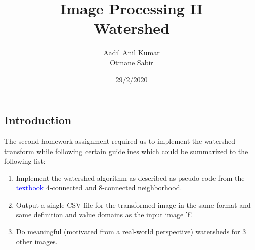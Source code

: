 \documentclass{article}
\begin{document}
\title{Image Processing II\\
 Watershed}
\author{Aadil Anil Kumar \\
Otmane Sabir
}
\date{29/2/2020}
\maketitle
\vspace{10mm}
\begin{center}
\section*{Introduction}
\large
The second homework assignment required us to implement the watershed transform while following certain guidelines which could be summarized to the following list: 
\vspace{7mm}
\begin{enumerate}
    \item Implement the watershed algorithm as described as pseudo code from the \hyperref[sec:hello]{\textcolor{blue}{textbook}} 4-connected and 8-connected neighborhood.
    \item Output a single CSV file for the transformed image in the same format and same definition and value domains as the input image 'f'.
    \item Do meaningful (motivated from a real-world perspective) watersheds for 3 other images.
\end{enumerate}
\end{center}
\newpage

\tableofcontents

\newpage
\end{document}
